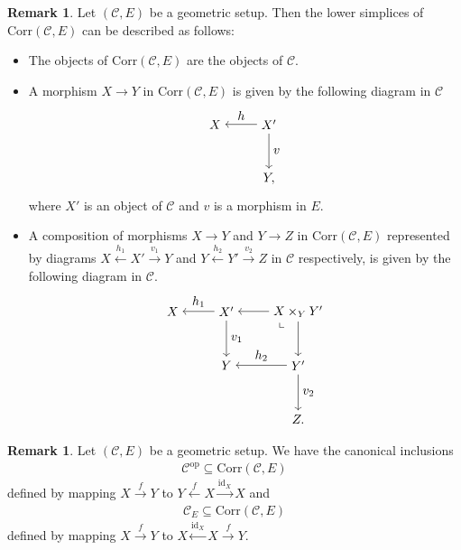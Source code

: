 \documentclass[a4paper,dvipdfmx,11pt,reqno]{amsart}
\DeclareMathOperator{\myop}{op}
\DeclareMathOperator{\id}{id}
\newcommand{\C}{\mathcal{C}}
\newcommand{\Corr}{\mathrm{Corr}}
\theoremstyle{definition}
\newtheorem{remark}[theorem]{Remark}
\begin{document}
\begin{remark}
  Let $(\C,E)$ be a geometric setup.
  Then the lower simplices of $\Corr(\C,E)$ can be described as follows:
  \begin{itemize}
    \item The objects of $\Corr(\C,E)$ are the objects of $\C$.
    \item A morphism $X \to Y$ in $\Corr(\C,E)$ is given by the following diagram in $\C$
    \[\begin{tikzpicture}[auto,->]
      \node (11) at (0,3) {$X$};
      \node (12) at (1.5,3) {$X'$};
      \node (22) at (1.5,1.5) {$Y,$};
      \draw (12) -- node[swap] {$h$} (11);
      \draw (12) -- node {$v$} (22);
    \end{tikzpicture}\]
    where $X'$ is an object of $\C$ and $v$ is a morphism in $E$.
    \item A composition of morphisms $X \to Y$ and $Y \to Z$ in $\Corr(\C,E)$ represented by diagrams $X \xleftarrow{h_1} X' \xrightarrow{v_1} Y$ and $Y \xleftarrow{h_2} Y' \xrightarrow{v_2} Z$ in $\C$ respectively, is given by the following diagram in $\C$.
    \[\begin{tikzpicture}[auto,->]
      \node (11) at (0,3) {$X$};
      \node (12) at (1.5,3) {$X'$};
      \node (13) at (3.5,3) {$X \times_{Y} Y'$};
      \node (22) at (1.5,1.5) {$Y$};
      \node (23) at (3.5,1.5) {$Y'$};
      \node (33) at (3.5,0) {$Z.$};
      \draw (12) -- node[swap] {$h_1$} (11);
      \draw (13) -- node[swap] {} (12);
      \draw (23) -- node[swap] {$h_2$} (22);
      \draw (12) -- node {$v_1$} (22);
      \draw (13) -- node {} (23);
      \draw (23) -- node {$v_2$} (33);
      \node at (3.1,2.6) {\rotatebox[origin=c]{90}{$\ulcorner$}};
    \end{tikzpicture}\]  
  \end{itemize}
\end{remark}

\begin{remark}
  Let $(\C,E)$ be a geometric setup.
  We have the canonical inclusions
  \begin{align*}
    \C^{\myop} \subseteq \Corr(\C,E)
  \end{align*}
  defined by mapping $X \xrightarrow{f} Y$ to $Y \xleftarrow{f} X \xrightarrow{\id_X} X$ and 
  \begin{align*}
    \C_E \subseteq \Corr(\C,E)
  \end{align*}
  defined by mapping $X \xrightarrow{f} Y$ to $X \xleftarrow{\id_X} X \xrightarrow{f} Y$.
\end{remark}
\end{document}
